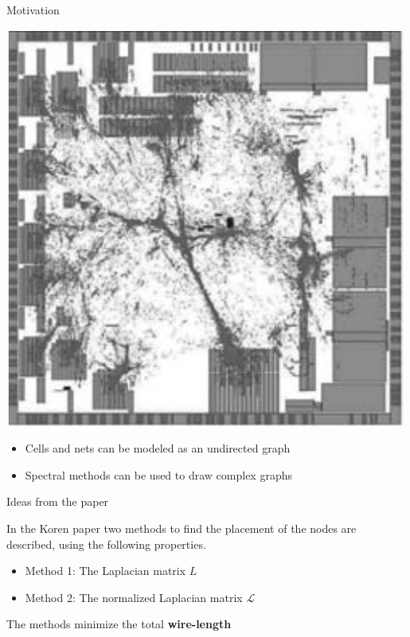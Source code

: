 \documentclass[serif, 12pt]{beamer}
\begin{document}
\begin{frame}{Motivation}

\begin{center}
\includegraphics[scale=0.3]{lots-cells.png}
\end{center}

\begin{itemize}
\item Cells and nets can be modeled as an undirected graph
\item Spectral methods can be used to draw complex graphs
\end{itemize}

\end{frame}

\begin{frame}{Ideas from the paper}

In the Koren paper \cite{koren} two methods to find the placement of the nodes 
are described, using the following properties.

\begin{itemize}
\item Method 1: The Laplacian matrix $L$
\item Method 2: The normalized Laplacian matrix $\mathcal L$
\end{itemize}

The methods minimize the total \textbf{wire-length}

\end{frame}
\end{document}
